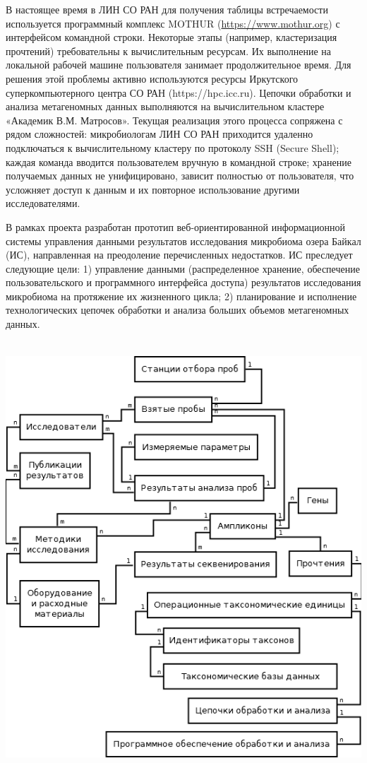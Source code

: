 \documentclass[a4paper,12pt,openany,final]{extreport}
\begin{document}
В настоящее время в ЛИН СО РАН для получения таблицы встречаемости
используется программный комплекс MOTHUR
(\href{https://www.mothur.org}{{https://www.mothur.org}}) с интерфейсом
командной строки. Некоторые этапы (например, кластеризация прочтений)
требовательны к вычислительным ресурсам. Их выполнение на локальной
рабочей машине пользователя занимает продолжительное время. Для решения
этой проблемы активно используются ресурсы Иркутского суперкомпьютерного
центра СО РАН (https://hpc.icc.ru). Цепочки обработки и анализа
метагеномных данных выполняются на вычислительном кластере «Академик
В.М. Матросов». Текущая реализация этого процесса сопряжена с рядом
сложностей: микробиологам ЛИН СО РАН приходится удаленно подключаться к
вычислительному кластеру по протоколу SSH (Secure Shell); каждая команда
вводится пользователем вручную в командной строке; хранение получаемых
данных не унифицировано, зависит полностью от пользователя, что
усложняет доступ к данным и их повторное использование другими
исследователями.

В рамках проекта разработан прототип веб-ориентированной информационной
системы управления данными результатов исследования микробиома озера
Байкал (ИС), направленная на преодоление перечисленных недостатков. ИС
преследует следующие цели: 1) управление данными (распределенное
хранение, обеспечение пользовательского и программного интерфейса
доступа) результатов исследования микробиома на протяжение их жизненного
цикла; 2) планирование и исполнение технологических цепочек обработки и
анализа больших объемов метагеномных данных.

\includegraphics[width=5.64653in,height=6.3625in]{media/image15.png}
\end{document}
